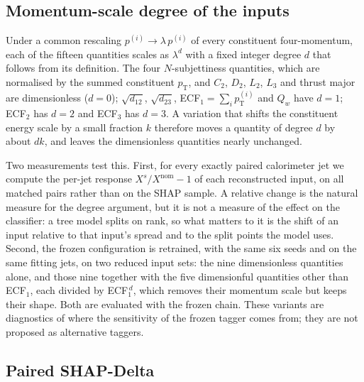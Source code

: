\documentclass[pdflatex,sn-mathphys,Numbered,iicol]{sn-jnl}
\newcommand{\pt}{p_{\mathrm{T}}}
\begin{document}
\subsection{Momentum-scale degree of the inputs}
\label{sec:degreemethod}

Under a common rescaling $p^{(i)} \to \lambda\,p^{(i)}$ of every constituent
four-momentum, each of the fifteen quantities scales as $\lambda^{d}$ with a fixed
integer degree $d$ that follows from its definition. The four $N$-subjettiness
quantities, which are normalised by the summed constituent $\pt$, and $C_2$, $D_2$,
$L_2$, $L_3$ and thrust major are dimensionless ($d=0$); $\sqrt{d_{12}}$,
$\sqrt{d_{23}}$, ECF$_1 = \sum_i \pt^{(i)}$ and $Q_w$ have $d=1$; ECF$_2$ has $d=2$ and
ECF$_3$ has $d=3$. A variation that shifts the constituent energy scale by a small
fraction $k$ therefore moves a quantity of degree $d$ by about $dk$, and leaves the
dimensionless quantities nearly unchanged.

Two measurements test this. First, for every exactly paired calorimeter jet we compute
the per-jet response $X^{s}/X^{\mathrm{nom}} - 1$ of each reconstructed input, on all
matched pairs rather than on the SHAP sample. A relative change is the natural measure
for the degree argument, but it is not a measure of the effect on the classifier: a tree
model splits on rank, so what matters to it is the shift of an input relative to that
input's spread and to the split points the model uses. Second, the frozen configuration is
retrained, with the same six seeds and on the same fitting jets, on two reduced input
sets: the nine dimensionless quantities alone, and those nine together with the five
dimensionful quantities other than ECF$_1$, each divided by ECF$_1^{\,d}$, which removes
their momentum scale but keeps their shape. Both are evaluated with the frozen chain. These
variants are diagnostics of where the sensitivity of the frozen tagger comes from; they
are not proposed as alternative taggers.

\subsection{Paired SHAP-Delta}
\label{sec:shapmethod}
\end{document}
